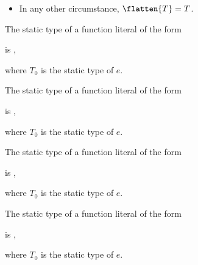 \documentclass[makeidx]{article}
\begin{document}
{\begin{itemize}
Then $\flatten{T} = S$.

\item In any other circumstance, $\flatten{T} = T$.
\end{itemize}

\LMHash{}%
The static type of a function literal of the form

\noindent
\code{<\TypeParametersStd>}

\noindent
{}

\noindent
is
,

\noindent
where $T_0$ is the static type of $e$.
\EndCase

\LMHash{}%
The static type of a function literal of the form

\noindent
\code{<\TypeParametersStd>}

\noindent
{}

\noindent
is
,

\noindent
where $T_0$ is the static type of $e$.
\EndCase

\LMHash{}%
The static type of a function literal of the form

\noindent
\code{<\TypeParametersStd>}

\noindent
{}

\noindent
is
,

\noindent
where $T_0$ is the static type of $e$.
\EndCase

\LMHash{}%
The static type of a function literal of the form

\noindent
\code{<\TypeParametersStd>}

\noindent
{}

\noindent
is
,

\noindent
where $T_0$ is the static type of $e$.
\EndCase

}
\end{document}
